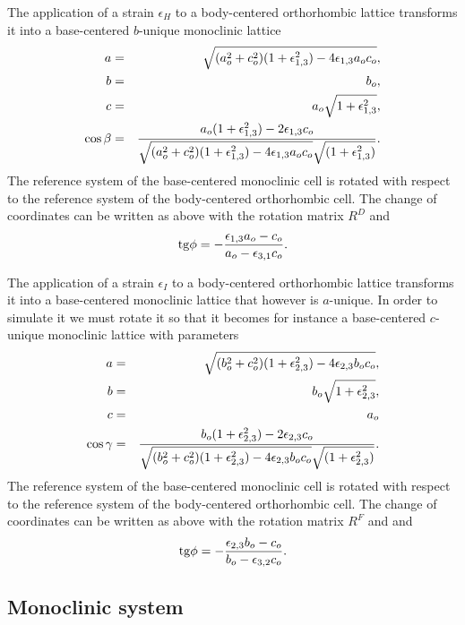 \documentclass[12pt,a4paper,twoside]{report}
\begin{document}
The application of a strain $\epsilon_H$ to a body-centered orthorhombic
lattice transforms it into a base-centered $b$-unique monoclinic lattice 
\begin{eqnarray}
a&=&\sqrt{(a_o^2+c_o^2)(1+\epsilon_{1,3}^2)-4\epsilon_{1,3}a_oc_o}, \\
b&=&b_o, \\
c&=&a_o \sqrt{1+\epsilon_{1,3}^2}, \\
\cos\beta &=& {a_o (1+\epsilon_{1,3}^2) -2 \epsilon_{1,3} c_o \over 
\sqrt{(a_o^2+c_o^2)(1+\epsilon_{1,3}^2)-4\epsilon_{1,3}a_oc_o} 
\sqrt{(1+\epsilon_{1,3}^2)}}.
\end{eqnarray}
The reference system of the base-centered monoclinic cell is rotated 
with respect to the reference system of the body-centered orthorhombic cell. 
The change of coordinates can be written as above with the rotation matrix 
$R^D$ and
\begin{equation}
{\rm tg} \phi = -{\epsilon_{1,3} a_o - c_o \over a_o - \epsilon_{3,1} c_o}.
\end{equation}

The application of a strain $\epsilon_I$ to a body-centered orthorhombic
lattice transforms it into a base-centered monoclinic lattice that however
is $a$-unique. In order to simulate it we must rotate it so that it
becomes for instance a base-centered $c$-unique monoclinic lattice with
parameters
\begin{eqnarray}
a&=&\sqrt{(b_o^2+c_o^2)(1+\epsilon_{2,3}^2)-4\epsilon_{2,3}b_oc_o}, \\
b&=&b_o \sqrt{1+\epsilon_{2,3}^2}, \\
c&=&a_o \\
\cos\gamma &=& {b_o (1+\epsilon_{2,3}^2) -2 \epsilon_{2,3} c_o \over 
\sqrt{(b_o^2+c_o^2)(1+\epsilon_{2,3}^2)-4\epsilon_{2,3}b_oc_o} 
\sqrt{(1+\epsilon_{2,3}^2)}}.
\end{eqnarray}
The reference system of the base-centered monoclinic cell is rotated 
with respect to the reference system of the body-centered orthorhombic cell. 
The change of coordinates can be written as above with the rotation matrix 
$R^F$ and
and 
\begin{equation}
{\rm tg} \phi = -{\epsilon_{2,3} b_o - c_o \over b_o - \epsilon_{3,2} c_o}.
\end{equation}

{\color{web-blue}\subsection{Monoclinic system}}
\color{black}
\end{document}
